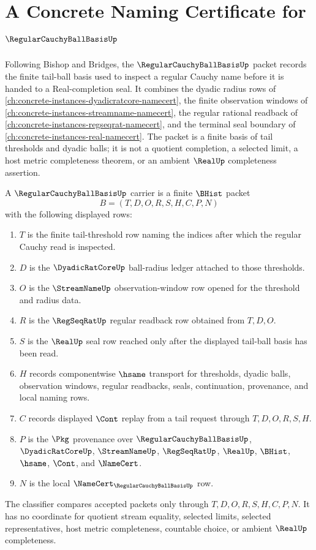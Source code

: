 \chapter{A Concrete Naming Certificate for $\RegularCauchyBallBasisUp$}
\label{ch:concrete-instances-regular-cauchy-ball-basis-namecert}

Following Bishop and Bridges, the $\RegularCauchyBallBasisUp$ packet records the finite tail-ball basis used to inspect a regular Cauchy name before it is handed to a Real-completion seal. It combines the dyadic radius rows of \autoref{ch:concrete-instances-dyadicratcore-namecert}, the finite observation windows of \autoref{ch:concrete-instances-streamname-namecert}, the regular rational readback of \autoref{ch:concrete-instances-regseqrat-namecert}, and the terminal seal boundary of \autoref{ch:concrete-instances-real-namecert}. The packet is a finite basis of tail thresholds and dyadic balls; it is not a quotient completion, a selected limit, a host metric completeness theorem, or an ambient $\RealUp$ completeness assertion.

\begin{definition}\label{def:regular-cauchy-ball-basis-carrier}
A $\RegularCauchyBallBasisUp$ carrier is a finite $\BHist$ packet
$$
B=(T,D,O,R,S,H,C,P,N)
$$
with the following displayed rows:
\begin{enumerate}
\item $T$ is the finite tail-threshold row naming the indices after which the regular Cauchy read is inspected.
\item $D$ is the $\DyadicRatCoreUp$ ball-radius ledger attached to those thresholds.
\item $O$ is the $\StreamNameUp$ observation-window row opened for the threshold and radius data.
\item $R$ is the $\RegSeqRatUp$ regular readback row obtained from $T,D,O$.
\item $S$ is the $\RealUp$ seal row reached only after the displayed tail-ball basis has been read.
\item $H$ records componentwise $\hsame$ transport for thresholds, dyadic balls, observation windows, regular readbacks, seals, continuation, provenance, and local naming rows.
\item $C$ records displayed $\Cont$ replay from a tail request through $T,D,O,R,S,H$.
\item $P$ is the $\Pkg$ provenance over $\RegularCauchyBallBasisUp$, $\DyadicRatCoreUp$, $\StreamNameUp$, $\RegSeqRatUp$, $\RealUp$, $\BHist$, $\hsame$, $\Cont$, and $\NameCert$.
\item $N$ is the local $\NameCert_{\RegularCauchyBallBasisUp}$ row.
\end{enumerate}
The classifier compares accepted packets only through $T,D,O,R,S,H,C,P,N$. It has no coordinate for quotient stream equality, selected limits, selected representatives, host metric completeness, countable choice, or ambient $\RealUp$ completeness.
\end{definition}


